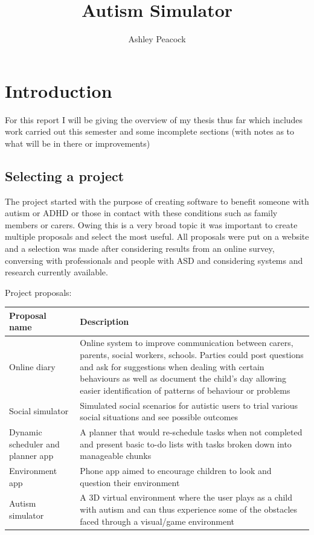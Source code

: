 \documentclass[11pt]{report}
\begin{document}
\title{Autism Simulator}
\author{Ashley Peacock}
\maketitle
\tableofcontents

\chapter{Introduction}
For this report I will be giving the overview of my thesis thus far which includes work carried out this semester and some incomplete sections (with notes as to what will be in there or improvements)

\section{Selecting a project}
The project started with the purpose of creating software to benefit someone with autism or ADHD or those in contact with these conditions such as family members or carers. Owing this is a very broad topic it was important to create multiple proposals and select the most useful. All proposals were put on a website and a selection was made after considering results from an online survey, conversing with professionals and people with ASD and considering systems and research currently available.

Project proposals:
\begin{table}[H]
    \begin{tabular}{| p{4cm} | p{9cm} |}
    \hline
    Proposal name & Description                                                                  \\
    \hline
    \hline
    Online diary & Online system to improve communication between carers, parents, social workers, schools. Parties could post questions and ask for suggestions when dealing with certain behaviours as well as document the child's day allowing easier identification of patterns of behaviour or problems                    \\
    \hline
    Social simulator & Simulated social scenarios for autistic users to trial various social situations and see possible outcomes  \\
    \hline
    Dynamic scheduler and planner app & A planner that would re-schedule tasks when not completed and present basic to-do lists with tasks broken down into manageable chunks  \\
    \hline
    Environment app & Phone app aimed to encourage children to look and question their environment \\
    \hline
   Autism simulator & A 3D virtual environment where the user plays as a child with autism and can thus experience some of the obstacles faced through a visual/game environment \\
    \hline
    \end{tabular}
\end{table}
\end{document}
